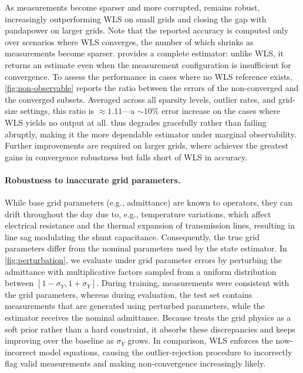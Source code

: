 As measurements become sparser and more corrupted, \genco remains robust, increasingly outperforming WLS on small grids and closing the gap with pandapower on larger grids. Note that the reported accuracy is computed only over scenarios where WLS converges, the number of which shrinks as measurements become sparser. \genco provides a complete estimator: unlike WLS, it returns an estimate even when the measurement configuration is insufficient for convergence. To assess the performance in cases where no WLS reference exists, \cref{fig:non-observable} reports the ratio between the errors of the non-converged and the converged subsets. Averaged across all sparsity levels, outlier rates, and grid-size settings, this ratio is $\approx 1.11$---a $\sim 10\%$ error increase on the cases where WLS yields no output at all. \genco thus degrades gracefully rather than failing abruptly, making it the more dependable estimator under marginal observability. Further improvements are required on larger grids, where \genco achieves the greatest gains in convergence robustness but falls short of WLS in accuracy.





\paragraph{Robustness to inaccurate grid parameters.}

While base grid parameters (e.g., admittance) are known to operators, they can drift throughout the day due to, e.g., temperature variations, which affect electrical resistance and the thermal expansion of transmission lines, resulting in line sag modulating the shunt capacitance. Consequently, the true grid parameters differ from the nominal parameters used by the state estimator. In \cref{fig:perturbation}, we evaluate \genco under grid parameter errors by perturbing the admittance with multiplicative factors sampled from a uniform distribution between $[1-\sigma_Y, 1+\sigma_Y]$. During training, measurements were consistent with the grid parameters, whereas during evaluation, the test set contains measurements that are generated using perturbed parameters, while the estimator receives the nominal admittance. Because \genco treats the grid physics as a soft prior rather than a hard constraint, it absorbs these discrepancies and keeps improving over the baseline as $\sigma_Y$ grows. In comparison, WLS enforces the now-incorrect model equations, causing the outlier-rejection procedure to incorrectly flag valid measurements and making non-convergence increasingly likely.\\


